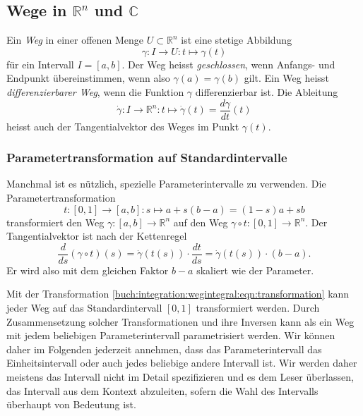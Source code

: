 %
%
%
\subsection{Wege in $\mathbb{R}^n$ und $\mathbb{C}$}
Ein \emph{Weg} in einer offenen Menge $U\subset \mathbb{R}^n$ ist eine
stetige Abbildung
\[
\gamma : I \to U : t \mapsto \gamma(t)
\]
für ein Intervall $I=[a,b]$.
Der Weg heisst \emph{geschlossen}, wenn Anfangs- und Endpunkt übereinstimmen,
%
%
wenn also $\gamma(a)=\gamma(b)$ gilt.
Ein Weg heisst \emph{differenzierbarer Weg}, wenn die Funktion $\gamma$
differenzierbar ist.
Die Ableitung
\[
\dot{\gamma}
\colon
I
\to
\mathbb{R}^n
:
t
\mapsto
\dot{\gamma}(t)
=
\frac{d\gamma}{dt}(t)
\]
heisst auch der Tangentialvektor des Weges im Punkt $\gamma(t)$.

%
%
\subsubsection{Parametertransformation auf Standardintervalle}
Manchmal ist es nützlich, spezielle Parameterintervalle zu verwenden.
Die Parametertransformation
\begin{equation}
t
\colon
[0,1] \to [a,b]
:
s
\mapsto
a + s (b-a)
=
(1-s)a
+
sb
\label{buch:integration:wegintegral:eqn:transformation}
\end{equation}
transformiert den Weg $\gamma\colon[a,b]\to \mathbb{R}^n$
auf den Weg $\gamma\circ t\colon [0,1]\to\mathbb{R}^n$.
Der Tangentialvektor ist nach der Kettenregel
\[
\frac{d}{ds}(\gamma\circ t)(s)
=
\dot{\gamma}(t(s))\cdot \frac{dt}{ds}
=
\dot{\gamma}(t(s))\cdot (b-a).
\]
Er wird also mit dem gleichen Faktor $b-a$ skaliert wie der Parameter.

Mit der Transformation
\eqref{buch:integration:wegintegral:eqn:transformation}
kann jeder Weg auf das Standardintervall $[0,1]$ transformiert werden.
Durch Zusammensetzung solcher Transformationen und ihre Inversen
kann als ein Weg mit jedem beliebigen Parameterintervall
parametrisiert werden.
Wir können daher im Folgenden jederzeit annehmen, dass das Parameterintervall
das Einheitsintervall oder auch jedes beliebige andere Intervall ist.
Wir werden daher meistens das Intervall nicht im Detail spezifizieren
und es dem Leser überlassen, das Intervall aus dem Kontext abzuleiten,
sofern die Wahl des Intervalls überhaupt von Bedeutung ist.

